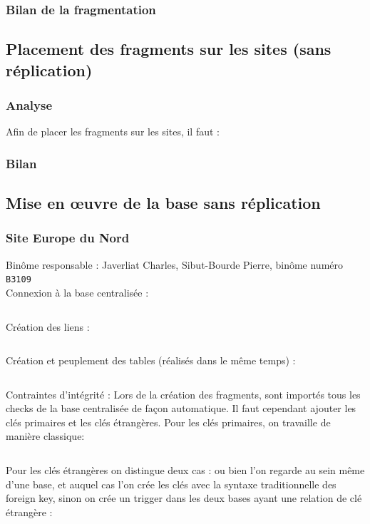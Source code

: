 \documentclass[10pt,a4paper]{article}
\theoremstyle{plain}
\begin{document}
\subsubsection{Bilan de la fragmentation}

\subsection{Placement des fragments sur les sites (sans réplication)}
\subsubsection{Analyse}
Afin de placer les fragments sur les sites, il faut :
\subsubsection{Bilan}

\newpage
\subsection{Mise en \oe uvre de la base sans réplication}
\subsubsection{Site Europe du Nord}
Binôme responsable : Javerliat Charles, Sibut-Bourde Pierre, binôme numéro \verb|B3109|\\

Connexion à la base centralisée :
\inputminted{sql}{EUN_connexion_db_ryori.sql}
\newpage

Création des liens :
\inputminted{sql}{INSA-DB12-EuropeNord-creation-liens-db.sql}
\newpage 

Création et peuplement des tables (réalisés dans le même temps) :\\
\inputminted{sql}{INSA-DB12-EuropeNord-fragmentation.sql}
\newpage 

Contraintes d'intégrité : Lors de la création des fragments, sont importés tous les checks de la base centralisée de façon automatique. Il faut cependant ajouter les clés primaires et les clés étrangères. Pour les clés primaires, on travaille de manière classique:\\
\inputminted{sql}{INSA-DB12-EuropeNord-contraintes-pk.sql}

\newpage

Pour les clés étrangères on distingue deux cas : ou bien l'on regarde au sein même d'une base, et auquel cas l'on crée les clés avec la syntaxe traditionnelle des foreign key, sinon on crée un trigger dans les deux bases ayant une relation de clé étrangère :\\
\end{document}
